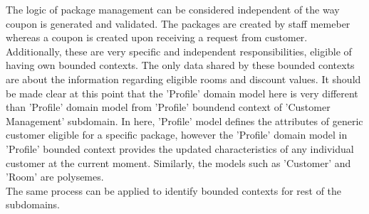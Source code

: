 The logic of package management can be considered independent of the way coupon is generated and validated. The packages are created by staff memeber whereas a coupon is created upon receiving a request from customer. Additionally, these are very specific and independent responsibilities, eligible of having own bounded contexts. The only data shared by these bounded contexts are about the information regarding eligible rooms and discount values. It should be made clear at this point that the 'Profile' domain model here is very different than 'Profile' domain model from 'Profile' boundend context of 'Customer Management' subdomain. In here, 'Profile' model defines the attributes of generic customer eligible for a specific package, however the 'Profile' domain model in 'Profile' bounded context provides the updated characteristics of any individual customer at the current moment. Similarly, the models such as 'Customer' and 'Room' are polysemes.\\
The same process can be applied to identify bounded contexts for rest of the subdomains.

